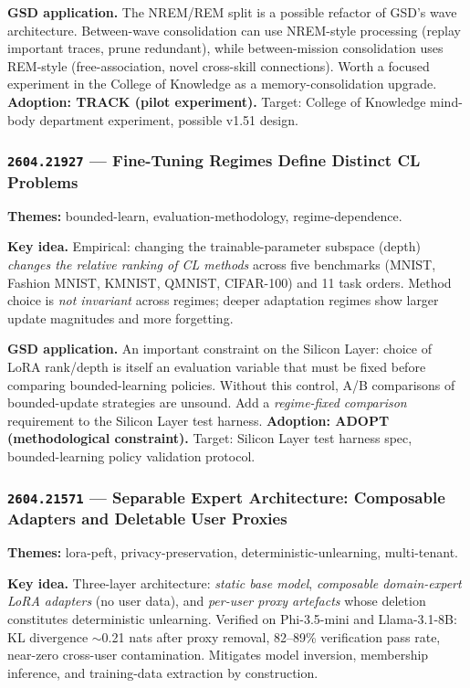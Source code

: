 \documentclass[11pt,letterpaper]{article}
\newcommand{\arxivid}[1]{\texttt{\textcolor{accent}{#1}}}
\newcommand{\paperhead}[2]{\noindent\textbf{\sffamily\textcolor{secondary}{#1}} \textemdash{} #2}
\begin{document}
\textbf{GSD application.} The NREM/REM split is a possible refactor of GSD's wave architecture. Between-wave consolidation can use NREM-style processing (replay important traces, prune redundant), while between-mission consolidation uses REM-style (free-association, novel cross-skill connections). Worth a focused experiment in the College of Knowledge as a memory-consolidation upgrade. \textbf{Adoption: TRACK (pilot experiment).} Target: College of Knowledge mind-body department experiment, possible v1.51 design.

\subsubsection{\arxivid{2604.21927} --- Fine-Tuning Regimes Define Distinct CL Problems}

\paperhead{Themes:}{bounded-learn, evaluation-methodology, regime-dependence.}

\textbf{Key idea.} Empirical: changing the trainable-parameter subspace (depth) \textit{changes the relative ranking of CL methods} across five benchmarks (MNIST, Fashion MNIST, KMNIST, QMNIST, CIFAR-100) and 11 task orders. Method choice is \textit{not invariant} across regimes; deeper adaptation regimes show larger update magnitudes and more forgetting.

\textbf{GSD application.} An important constraint on the Silicon Layer: choice of LoRA rank/depth is itself an evaluation variable that must be fixed before comparing bounded-learning policies. Without this control, A/B comparisons of bounded-update strategies are unsound. Add a \textit{regime-fixed comparison} requirement to the Silicon Layer test harness. \textbf{Adoption: ADOPT (methodological constraint).} Target: Silicon Layer test harness spec, bounded-learning policy validation protocol.

\subsubsection{\arxivid{2604.21571} --- Separable Expert Architecture: Composable Adapters and Deletable User Proxies}

\paperhead{Themes:}{lora-peft, privacy-preservation, deterministic-unlearning, multi-tenant.}

\textbf{Key idea.} Three-layer architecture: \textit{static base model}, \textit{composable domain-expert LoRA adapters} (no user data), and \textit{per-user proxy artefacts} whose deletion constitutes deterministic unlearning. Verified on Phi-3.5-mini and Llama-3.1-8B: KL divergence ${\sim}$0.21 nats after proxy removal, 82--89\% verification pass rate, near-zero cross-user contamination. Mitigates model inversion, membership inference, and training-data extraction by construction.
\end{document}
